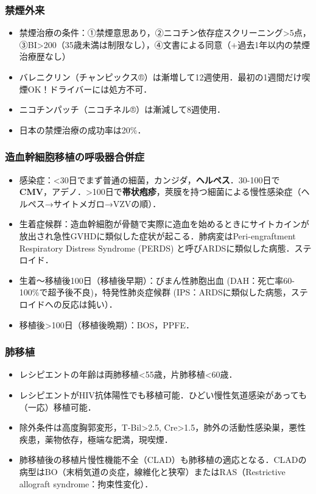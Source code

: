 \subsubsection{禁煙外来}

\begin{itemize}
\item 禁煙治療の条件：①禁煙意思あり，②ニコチン依存症スクリーニング>5点，③BI>200（35歳未満は制限なし），④文書による同意（+過去1年以内の禁煙治療歴なし）
\item バレニクリン（チャンピックス®）は漸増して12週使用．最初の1週間だけ喫煙OK！ドライバーには処方不可．
\item ニコチンパッチ（ニコチネル®）は漸減して8週使用．
\item 日本の禁煙治療の成功率は20\%．
\end{itemize}


\subsubsection{造血幹細胞移植の呼吸器合併症}

\begin{itemize}
\item 感染症：<30日でまず普通の細菌，カンジダ，\textbf{ヘルペス}．30-100日で\textbf{CMV}，アデノ．>100日で\textbf{帯状疱疹}，莢膜を持つ細菌による慢性感染症（ヘルペス→サイトメガロ→VZVの順）．

\item 生着症候群：造血幹細胞が骨髄で実際に造血を始めるときにサイトカインが放出され急性GVHDに類似した症状が起こる．肺病変はPeri-engraftment Respiratory Distress Syndrome (PERDS) と呼びARDSに類似した病態．ステロイド．
\item 生着〜移植後100日（移植後早期）：びまん性肺胞出血 (DAH：死亡率60-100\%で超予後不良)，特発性肺炎症候群 (IPS：ARDSに類似した病態，ステロイドへの反応は鈍い）．
\item 移植後>100日（移植後晩期）：BOS，PPFE．

\end{itemize}

\subsubsection{肺移植}

\begin{itemize}
\item レシピエントの年齢は両肺移植<55歳，片肺移植<60歳．
\item レシピエントがHIV抗体陽性でも移植可能．ひどい慢性気道感染があっても（一応）移植可能．
\item 除外条件は高度胸郭変形，T-Bil>2.5, Cre>1.5，肺外の活動性感染巣，悪性疾患，薬物依存，極端な肥満，現喫煙．
\item 肺移植後の移植片慢性機能不全（CLAD）も肺移植の適応となる．CLADの病型はBO（末梢気道の炎症，線維化と狭窄）またはRAS（Restrictive allograft syndrome：拘束性変化）．
\end{itemize}
